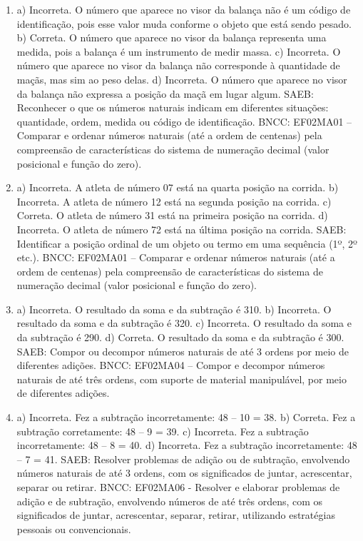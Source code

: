 
\begin{enumerate}
\item
a) Incorreta. O número que aparece no visor da balança não é um código
de identificação, pois esse valor muda conforme o objeto que está sendo
pesado.
b) Correta. O número que aparece no visor da balança representa uma
medida, pois a balança é um instrumento de medir massa.
c) Incorreta. O número que aparece no visor da balança não corresponde à
quantidade de maçãs, mas sim ao peso delas.
d) Incorreta. O número que aparece no visor da balança não expressa a
posição da maçã em lugar algum.
SAEB: Reconhecer o que os números naturais indicam em diferentes
situações: quantidade, ordem, medida ou código de identificação.
BNCC: EF02MA01 -- Comparar e ordenar números naturais (até a ordem de
centenas) pela compreensão de características do sistema de numeração
decimal (valor posicional e função do zero).

\item
a) Incorreta. A atleta de número 07 está na quarta posição na corrida.
b) Incorreta. A atleta de número 12 está na segunda posição na corrida.
c) Correta. O atleta de número 31 está na primeira posição na corrida.
d) Incorreta. O atleta de número 72 está na última posição na corrida.
SAEB: Identificar a posição ordinal de um objeto ou termo
em uma sequência (1º, 2º etc.).
BNCC: EF02MA01 -- Comparar e ordenar números naturais (até a ordem de
centenas) pela compreensão de características do sistema de numeração
decimal (valor posicional e função do zero).

\item
a) Incorreta. O resultado da soma e da subtração é 310.
b) Incorreta. O resultado da soma e da subtração é 320.
c) Incorreta. O resultado da soma e da subtração é 290.
d) Correta. O resultado da soma e da subtração é 300.
SAEB: Compor ou decompor números naturais de até 3 ordens por
meio de diferentes adições.
BNCC: EF02MA04 -- Compor e decompor números naturais de até três ordens,
com suporte de material manipulável, por meio de diferentes adições.

\item
a) Incorreta. Fez a subtração incorretamente: 48 -- 10 = 38.
b) Correta. Fez a subtração corretamente: 48 -- 9 = 39.
c) Incorreta. Fez a subtração incorretamente: 48 -- 8 = 40.
d) Incorreta. Fez a subtração incorretamente: 48 -- 7 = 41.
SAEB: Resolver problemas de adição ou de subtração, envolvendo
números naturais de até 3 ordens, com os significados de juntar,
acrescentar, separar ou retirar.
BNCC: EF02MA06 - Resolver e elaborar problemas de adição e de subtração,
envolvendo números de até três ordens, com os significados de juntar,
acrescentar, separar, retirar, utilizando estratégias pessoais ou
convencionais.


\end{enumerate}

